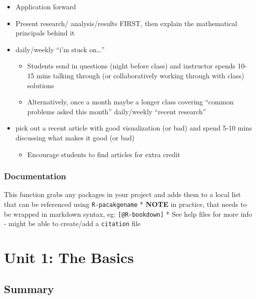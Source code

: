 \documentclass[
]{book}
\providecommand{\tightlist}{%
  \setlength{\itemsep}{0pt}\setlength{\parskip}{0pt}}
\begin{document}
\begin{itemize}
\tightlist
\item
  Application forward
\item
  Present research/ analysis/results FIRST, then explain the mathematical principals behind it
\item
  daily/weekly ``i'm stuck on\ldots{}''

  \begin{itemize}
  \tightlist
  \item
    Students send in questions (night before class) and instructor spends 10-15 mins talking through (or collaboratively working through with class) solutions
  \item
    Alternatively, once a month maybe a longer class covering ``common problems asked this month''
    daily/weekly ``recent research''
  \end{itemize}
\item
  pick out a recent article with good visualization (or bad) and spend 5-10 mins discussing what makes it good (or bad)

  \begin{itemize}
  \tightlist
  \item
    Encourage students to find articles for extra credit
  \end{itemize}
\end{itemize}

\hypertarget{documentation}{%
\subsection*{Documentation}\label{documentation}}

This function grabs any packages in your project and adds them to a local list that can be referenced using \texttt{R-pacakgename}
* \textbf{NOTE} in practice, that needs to be wrapped in markdown syntax, eg:
\texttt{{[}@R-bookdown{]}}
* See help files for more info - might be able to create/add a \texttt{citation} file

\hypertarget{unit-1-the-basics}{%
\chapter*{Unit 1: The Basics}\label{unit-1-the-basics}}

\hypertarget{summary}{%
\section*{Summary}\label{summary}}
\end{document}
